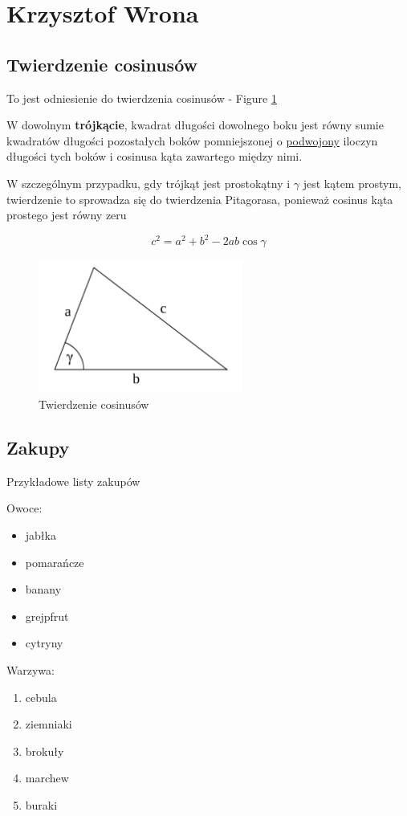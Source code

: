 \section{Krzysztof Wrona}

\subsection{Twierdzenie cosinusów}

To jest odniesienie do twierdzenia cosinusów - Figure \ref{fig:twierdzenie_cosinusow}

W dowolnym \textbf{trójkącie}, kwadrat długości dowolnego boku jest równy sumie kwadratów długości pozostałych boków pomniejszonej o \underline{podwojony} iloczyn długości tych boków i cosinusa kąta zawartego między nimi.

W szczególnym przypadku, gdy trójkąt jest prostokątny i $\gamma$ jest kątem prostym, twierdzenie to sprowadza się do twierdzenia Pitagorasa, ponieważ cosinus kąta prostego jest równy zeru


\[ c^2 = a^2 + b^2 - 2ab \cos \gamma \]


\begin{figure}[h] 
\centering
\includegraphics[width=0.6\textwidth]{pictures/twierdzenie_cosinusow.png}
\caption{\label{fig:twierdzenie_cosinusow}Twierdzenie cosinusów}
\end{figure}





\subsection{Zakupy}

Przykładowe listy zakupów

Owoce:

\begin{itemize}
\item jabłka
\item pomarańcze
\item banany
\item grejpfrut
\item cytryny
\end{itemize}

Warzywa:

\begin{enumerate}
\item cebula
\item ziemniaki
\item brokuły
\item marchew
\item buraki
\end{enumerate}